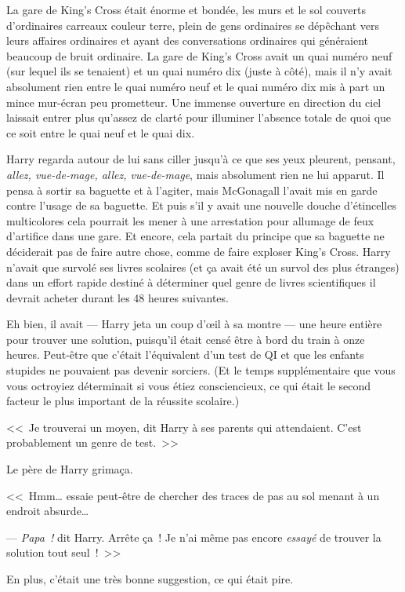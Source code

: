 La gare de King's Cross était énorme et bondée, les murs et le sol couverts d'ordinaires carreaux couleur terre, plein de gens ordinaires se dépêchant vers leurs affaires ordinaires et ayant des conversations ordinaires qui généraient beaucoup de bruit ordinaire. La gare de King's Cross avait un quai numéro neuf (sur lequel ils se tenaient) et un quai numéro dix (juste à côté), mais il n'y avait absolument rien entre le quai numéro neuf et le quai numéro dix mis à part un mince mur-écran peu prometteur. Une immense ouverture en direction du ciel laissait entrer plus qu'assez de clarté pour illuminer l'absence totale de quoi que ce soit entre le quai neuf et le quai dix.

Harry regarda autour de lui sans ciller jusqu'à ce que ses yeux pleurent, pensant, \emph{allez, vue-de-mage, allez, vue-de-mage}, mais absolument rien ne lui apparut. Il pensa à sortir sa baguette et à l'agiter, mais McGonagall l'avait mis en garde contre l'usage de sa baguette. Et puis s'il y avait une nouvelle douche d'étincelles multicolores cela pourrait les mener à une arrestation pour allumage de feux d'artifice dans une gare. Et encore, cela partait du principe que sa baguette ne déciderait pas de faire autre chose, comme de faire exploser King's Cross. Harry n'avait que survolé ses livres scolaires (et ça avait été un survol des plus étranges) dans un effort rapide destiné à déterminer quel genre de livres scientifiques il devrait acheter durant les 48 heures suivantes.

Eh bien, il avait — Harry jeta un coup d'œil à sa montre — une heure entière pour trouver une solution, puisqu'il était censé être à bord du train à onze heures. Peut-être que c'était l'équivalent d'un test de QI et que les enfants stupides ne pouvaient pas devenir sorciers. (Et le temps supplémentaire que vous vous octroyiez déterminait si vous étiez consciencieux, ce qui était le second facteur le plus important de la réussite scolaire.)

<<~Je trouverai un moyen, dit Harry à ses parents qui attendaient. C'est probablement un genre de test.~>>

Le père de Harry grimaça.

<<~Hmm… essaie peut-être de chercher des traces de pas au sol menant à un endroit absurde…

--- \emph{Papa~!} dit Harry. Arrête ça~! Je n'ai même pas encore \emph{essayé} de trouver la solution tout seul~!~>>

En plus, c'était une très bonne suggestion, ce qui était pire.

